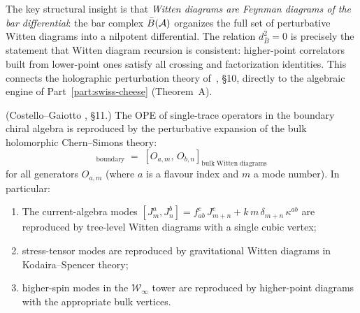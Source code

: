 \begin{remark}
The key structural insight is that \emph{Witten diagrams are Feynman
diagrams of the bar differential}: the bar complex $\bar{B}(\mathcal A)$ organizes
the full set of perturbative Witten diagrams into a nilpotent
differential. The relation $d_{\bar{B}}^2 = 0$ is precisely the
statement that Witten diagram recursion is consistent: higher-point
correlators built from lower-point ones satisfy all crossing and
factorization identities. This connects the holographic perturbation
theory of~\cite{CG18}, \S10, directly to the algebraic engine of
Part~\ref{part:swiss-cheese} (Theorem~A).
\end{remark}

\begin{proposition}
\textup{(Costello--Gaiotto \cite{CG18}, \S11.)}
The OPE of single-trace operators in the boundary chiral algebra is
reproduced by the perturbative expansion of the bulk holomorphic
Chern--Simons theory:
\begin{equation}%
 [O_{a,m},\, O_{b,n}]_{\mathrm{boundary}}
 \;=\;
 [O_{a,m},\, O_{b,n}]_{\mathrm{bulk\;Witten\;diagrams}}
\end{equation}
for all generators $O_{a,m}$ (where $a$ is a flavour index and $m$ a
mode number). In particular:
\begin{enumerate}[label=\textup{(\roman*)},nosep]
\item The current-algebra modes $[J^a_m, J^b_n] = f^{c}_{ab}\,J^c_{m+n}
 + k\,m\,\delta_{m+n}\,\kappa^{ab}$ are reproduced by
 tree-level Witten diagrams with a single cubic vertex;
\item stress-tensor modes are reproduced by gravitational Witten
 diagrams in Kodaira--Spencer theory;
\item higher-spin modes in the $\mathcal{W}_\infty$ tower are
 reproduced by higher-point diagrams with the appropriate bulk
 vertices.
\end{enumerate}
\end{proposition}

